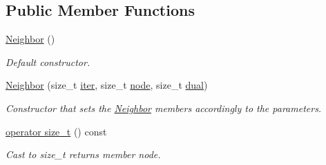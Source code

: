  \subsection*{Public Member Functions}
\begin{CompactItemize}
\item 
\hypertarget{structdai_1_1BipartiteGraph_1_1Neighbor_0f0b8b66954a515ce875c3a6d1a0ac76}{
\hyperlink{structdai_1_1BipartiteGraph_1_1Neighbor_0f0b8b66954a515ce875c3a6d1a0ac76}{Neighbor} ()}
\label{structdai_1_1BipartiteGraph_1_1Neighbor_0f0b8b66954a515ce875c3a6d1a0ac76}

\begin{CompactList}\small\item\em Default constructor. \item\end{CompactList}\item 
\hypertarget{structdai_1_1BipartiteGraph_1_1Neighbor_071eaf505d2ccf4fa1acfe86a3b5fd75}{
\hyperlink{structdai_1_1BipartiteGraph_1_1Neighbor_071eaf505d2ccf4fa1acfe86a3b5fd75}{Neighbor} (size\_\-t \hyperlink{structdai_1_1BipartiteGraph_1_1Neighbor_66412c1951bbf7023ee692b60af52979}{iter}, size\_\-t \hyperlink{structdai_1_1BipartiteGraph_1_1Neighbor_59a333d966c5662fa19aa08ca8fb9aba}{node}, size\_\-t \hyperlink{structdai_1_1BipartiteGraph_1_1Neighbor_4b63f7dff21e11d61518f1264c541bd8}{dual})}
\label{structdai_1_1BipartiteGraph_1_1Neighbor_071eaf505d2ccf4fa1acfe86a3b5fd75}

\begin{CompactList}\small\item\em Constructor that sets the \hyperlink{structdai_1_1BipartiteGraph_1_1Neighbor}{Neighbor} members accordingly to the parameters. \item\end{CompactList}\item 
\hypertarget{structdai_1_1BipartiteGraph_1_1Neighbor_d3d8a5b23bdb5986fa4d1ad8937ccd73}{
\hyperlink{structdai_1_1BipartiteGraph_1_1Neighbor_d3d8a5b23bdb5986fa4d1ad8937ccd73}{operator size\_\-t} () const }
\label{structdai_1_1BipartiteGraph_1_1Neighbor_d3d8a5b23bdb5986fa4d1ad8937ccd73}

\begin{CompactList}\small\item\em Cast to size\_\-t returns member node. \item\end{CompactList}\end{CompactItemize}
